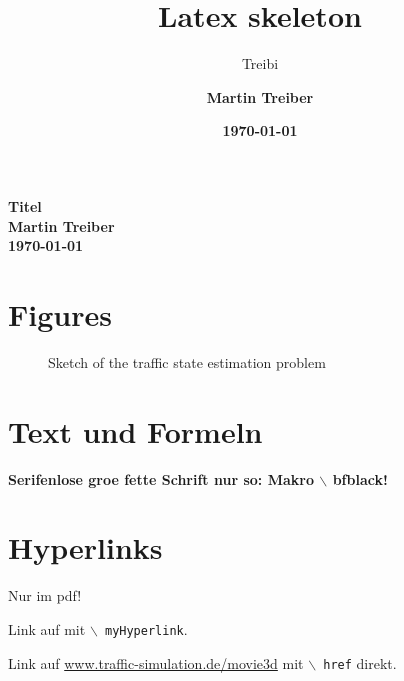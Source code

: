 \documentclass[12pt,a4paper]{scrartcl}
\begin{document}
\title{Latex skeleton}
\author{Treibi}
\author{\large\sf\textbf{Martin Treiber}}
\date{\normalsize\sf\textbf{\today}}

\maketitle %


\thispagestyle{empty}
\begin{center}
\LARGE\sf\textbf{Titel}
\\[5mm]
\large\sf\textbf{Martin Treiber}
\\
\large\sf\textbf{\today}
\end{center}


\tableofcontents

\section{Figures}
\begin{figure}
\caption{\label{fig:sketchGen}Sketch of the traffic state estimation
  problem}
\end{figure}

\section{Text und Formeln}

{\large\sf\textbf{Serifenlose gro\3e fette Schrift nur so:
Makro  $\backslash\!\!$ bfblack!}}

\section{Hyperlinks}
Nur im pdf!


Link auf 
mit {\tt $\backslash\!\!\!$ myHyperlink}.

Link auf
\href{http://www.mtreiber.de/movie3d/index.html}{www.traffic-simulation.de/movie3d}
mit {\tt $\backslash\!\!\!$ href} direkt.
\end{document}
